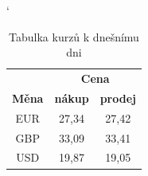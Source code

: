 \documentclass[11pt,a4paper,onecolumn]{article}
\begin{document}
\begin{table}[ht]

\catcode`
\begin{center}
\begin{tabular}[p]{| c | c | c |}

\hline 
& \multicolumn{2}{c|}{\bfseries Cena} \\\cline{2-3}
\textbf{Měna} &  \textbf{nákup} & \textbf{prodej} \\\hline
EUR  & 27,34 & 27,42 \\
GBP  & 33,09 & 33,41 \\
USD  & 19,87 & 19,05 \\\hline
\end{tabular}
\caption{Tabulka kurzů k dnešnímu dni}
\label{tab1}
\end{center}
\end{table}
\end{document}
